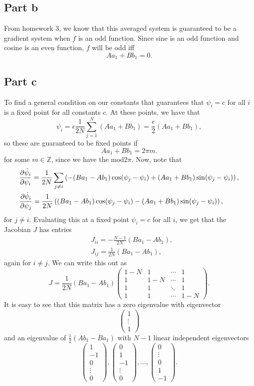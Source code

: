 \documentclass{article}
\begin{document}
\subsection{Part b}
From homework 3, we know that this averaged system is guaranteed to be a gradient system when $f$ is an odd function. Since sine is an odd function and cosine is an even function, $f$ will be odd iff
\[
Aa_1+Bb_1=0.
\]

\subsection{Part c}
To find a general condition on our constants that guarantees that $\psi_i=c$ for all $i$  is a fixed point for all constants $c$. At these points, we have that 
\[
\dot\psi_i=\epsilon\frac{1}{2N}\sum_{j=1}^N(Aa_1+Bb_1)=\frac{\epsilon}{2}(Aa_1+Bb_1),
\]
so these are guaranteed to be fixed points if 
\[
Aa_1+Bb_1=2\pi m.
\]
for some $m\in\mathbb{Z}$, since we have the $\text{mod}2\pi$. Now, note that 
\begin{align*}
&\frac{\partial \dot\psi_i}{\partial \psi_i}=\frac{1}{2N}\sum_{j\neq i}\left(-(Ba_1-Ab_1)\cos(\psi_j-\psi_i)+(Aa_1+Bb_1)\sin(\psi_j-\psi_i)\right),\\
&\frac{\partial \dot\psi_i}{\partial \psi_j}=\frac{1}{2N}\left((Ba_1-Ab_1)\cos(\psi_j-\psi_i)-(Aa_1+Bb_1)\sin(\psi_j-\psi_i)\right),
\end{align*}
for $j\neq i$. Evaluating this at a fixed point $\psi_i=c$ for all $i$, we get that the Jacobian $J$ has entries
\begin{align*}
&J_{ii}=-\frac{N-1}{2N}(Ba_1-Ab_1),\\
&J_{ij}=\frac{1}{2N}(Ba_1-Ab_1),
\end{align*}
again for $i\neq j$. We can write this out as 
\[
J=\frac{1}{2N}(Ba_1-Ab_1)\begin{pmatrix}
	1-N&1&\cdots&1\\
	1&1-N&\cdots&1\\
	1&1&\ddots&1\\
	1&1&\cdots&1-N
\end{pmatrix}.
\]
It is easy to see that this matrix has a zero eigenvalue with eigenvector
\[
\begin{pmatrix}
	1\\\vdots\\1
\end{pmatrix}
\]
and an eigenvalue of $\frac{1}{2}(Ab_1-Ba_1)$ with $N-1$ linear independent eigenvectors
\[
\begin{pmatrix}
	1\\-1\\0\\\vdots\\0
\end{pmatrix},\begin{pmatrix}
0\\1\\-1\\\vdots\\0
\end{pmatrix},\ldots,\begin{pmatrix}
0\\\vdots\\0\\1\\-1
\end{pmatrix}.
\]
\end{document}
